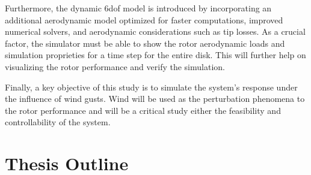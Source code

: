 Furthermore, the dynamic \gls{6dof} model is introduced by incorporating an additional aerodynamic model optimized for faster computations, improved numerical solvers, and aerodynamic considerations such as tip losses. As a crucial factor, the simulator must be able to show the rotor aerodynamic loads and simulation proprieties for a time step for the entire disk. This will further help on visualizing the rotor performance and verify the simulation.

Finally, a key objective of this study is to simulate the system's response under the influence of wind gusts. Wind will be used as the perturbation phenomena to the rotor performance and will be a critical study either the feasibility and controllability of the system.

\section{Thesis Outline}
\label{section:outline}
